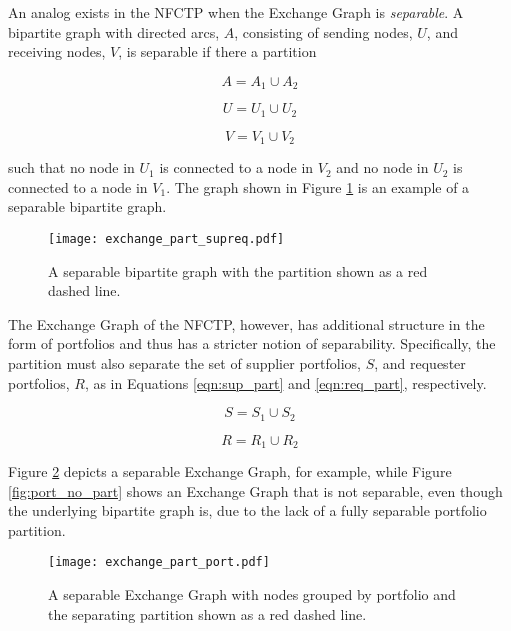 An analog exists in the NFCTP when the Exchange Graph is \textit{separable}. A
bipartite graph with directed arcs, $A$, consisting of sending nodes, $U$, and
receiving nodes, $V$, is separable if there a partition

\begin{equation}
  A = A_{1} \cup A_{2}
\end{equation}

\begin{equation}
  U = U_{1} \cup U_{2}
\end{equation}

\begin{equation}
  V = V_{1} \cup V_{2}
\end{equation}

such that no node in $U_1$ is connected to a node in $V_2$ and no node in $U_2$
is connected to a node in $V_1$. The graph shown in Figure \ref{fig:basic_part} is an
example of a separable bipartite graph.

\begin{figure}
  \begin{center}
    \texttt{[image: exchange\_part\_supreq.pdf]}
    \caption[]{
      \label{fig:basic_part}
      A separable bipartite graph with the partition shown as a red 
      dashed line.}
  \end{center}
\end{figure}

The Exchange Graph of the NFCTP, however, has additional structure in the form
of portfolios and thus has a stricter notion of separability. Specifically, the
partition must also separate the set of supplier portfolios, $S$, and requester
portfolios, $R$, as in Equations \ref{eqn:sup_part} and \ref{eqn:req_part},
respectively.

\begin{equation}\label{eqn:sup_part}
  S = S_{1} \cup S_{2}
\end{equation}

\begin{equation}\label{eqn:req_part}
  R = R_{1} \cup R_{2}
\end{equation}

Figure \ref{fig:port_part} depicts a separable Exchange Graph, for example,
while Figure \ref{fig:port_no_part} shows an Exchange Graph that is not
separable, even though the underlying bipartite graph is, due to the lack of a
fully separable portfolio partition.

\begin{figure}
  \begin{center}
    \texttt{[image: exchange\_part\_port.pdf]}
    \caption[]{
      \label{fig:port_part}
      A separable Exchange Graph with nodes grouped by portfolio and the
      separating partition shown as a red dashed line.}
  \end{center}
\end{figure}

